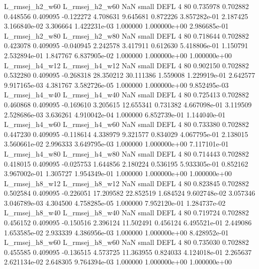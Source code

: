 L_rmsej_h2_w60 L_rmsej_h2_w60                   NaN      small     DEFL                 4 80 0.735978       0.702882 0.448556       0.409095   -0.122272      4.708631      9.645681     0.872226   3.857282e-01  2.187425 3.166840e-02     3.306664   1.422231e-03            1.000000    1.000000e+00        2.986685e-01
L_rmsej_h2_w80 L_rmsej_h2_w80                   NaN      small     DEFL                 4 80 0.718644       0.702882 0.423078       0.409095   -0.040945      2.242578      3.417911     0.612630   5.418806e-01  1.150791 2.532894e-01     1.847767   6.837905e-02            1.000000    1.000000e+00        1.000000e+00
L_rmsej_h4_w12 L_rmsej_h4_w12                   NaN      small     DEFL                 4 80 0.902150       0.702882 0.532280       0.409095   -0.268318     28.350212     30.111386     1.559008   1.229919e-01  2.642577 9.917165e-03     4.381767   3.582726e-05            1.000000    1.000000e+00        9.852495e-03
L_rmsej_h4_w40 L_rmsej_h4_w40                   NaN      small     DEFL                 4 80 0.725413       0.702882 0.460868       0.409095   -0.169610      3.205615     12.655341     0.731382   4.667098e-01  3.119509 2.528686e-03     3.636261   4.910042e-04            1.000000    6.852739e-01        1.144040e-01
L_rmsej_h4_w60 L_rmsej_h4_w60                   NaN      small     DEFL                 4 80 0.733380       0.702882 0.447230       0.409095   -0.118614      4.338979      9.321577     0.834029   4.067795e-01  2.138015 3.560661e-02     2.996333   3.649795e-03            1.000000    1.000000e+00        7.117101e-01
L_rmsej_h4_w80 L_rmsej_h4_w80                   NaN      small     DEFL                 4 80 0.714443       0.702882 0.418015       0.409095   -0.025753      1.644856      2.180224     0.536195   5.933305e-01  0.852162 3.967002e-01     1.305727   1.954349e-01            1.000000    1.000000e+00        1.000000e+00
L_rmsej_h8_w12 L_rmsej_h8_w12                   NaN      small     DEFL                 4 80 0.823845       0.702882 0.502584       0.409095   -0.226051     17.209582     22.852519     1.684524   9.602748e-02  3.057346 3.046789e-03     4.304500   4.758285e-05            1.000000    7.952120e-01        1.284737e-02
L_rmsej_h8_w40 L_rmsej_h8_w40                   NaN      small     DEFL                 4 80 0.719724       0.702882 0.456152       0.409095   -0.150516      2.396124     11.502491     0.456124   6.495521e-01  2.449086 1.653585e-02     2.933339   4.386956e-03            1.000000    1.000000e+00        8.428952e-01
L_rmsej_h8_w60 L_rmsej_h8_w60                   NaN      small     DEFL                 4 80 0.735030       0.702882 0.455585       0.409095   -0.136515      4.573725     11.363955     0.824033   4.124018e-01  2.265637 2.621134e-02     2.648305   9.764394e-03            1.000000    1.000000e+00        1.000000e+00
